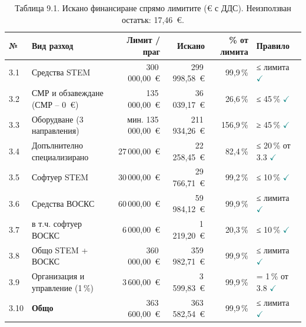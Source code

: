 \documentclass[11pt,a4paper]{article}
\newcommand{\NumLeftTotal}{17,46~€}
\begin{document}
\begin{table}[h]\centering\footnotesize
\begin{tabularx}{\textwidth}{@{}l X r r r l@{}}
\toprule
\textbf{№} & \textbf{Вид разход} & \textbf{Лимит / праг} & \textbf{Искано} & \textbf{\% от лимита} & \textbf{Правило} \\
\midrule
3.1 & Средства STEM & 300\,000,00~€ & 299\,998,58~€ & 99,9\,\% & ≤ лимита \textcolor{teal}{$\checkmark$} \\
3.2 & СМР и обзавеждане (СМР – 0~€) & 135\,000,00~€ & 36\,039,17~€ & 26,6\,\% & ≤ 45\,\% \textcolor{teal}{$\checkmark$} \\
3.3 & Оборудване (3 направления) & мин. 135\,000,00~€ & 211\,934,26~€ & 156,9\,\% & ≥ 45\,\% \textcolor{teal}{$\checkmark$} \\
3.4 & Допълнително специализирано & 27\,000,00~€ & 22\,258,45~€ & 82,4\,\% & ≤ 20\,\% от 3.3 \textcolor{teal}{$\checkmark$} \\
3.5 & Софтуер STEM & 30\,000,00~€ & 29\,766,71~€ & 99,2\,\% & ≤ 10\,\% \textcolor{teal}{$\checkmark$} \\
3.6 & Средства ВОСКС & 60\,000,00~€ & 59\,984,12~€ & 99,9\,\% & ≤ лимита \textcolor{teal}{$\checkmark$} \\
3.7 & в т.ч. софтуер ВОСКС & 6\,000,00~€ & 1\,219,20~€ & 20,3\,\% & ≤ 10\,\% \textcolor{teal}{$\checkmark$} \\
3.8 & Общо STEM + ВОСКС & 360\,000,00~€ & 359\,982,71~€ & 99,9\,\% & ≤ лимита \textcolor{teal}{$\checkmark$} \\
3.9 & Организация и управление (1\,\%) & 3\,600,00~€ & 3\,599,83~€ & 99,9\,\% & = 1\,\% от 3.8 \textcolor{teal}{$\checkmark$} \\
3.10 & \textbf{Общо} & 363\,600,00~€ & 363\,582,54~€ & 99,9\,\% & ≤ лимита \textcolor{teal}{$\checkmark$} \\
\bottomrule
\end{tabularx}
\caption*{\footnotesize Таблица 9.1. Искано финансиране спрямо лимитите (€ с ДДС). Неизползван остатък: \NumLeftTotal.}
\end{table}
\end{document}
